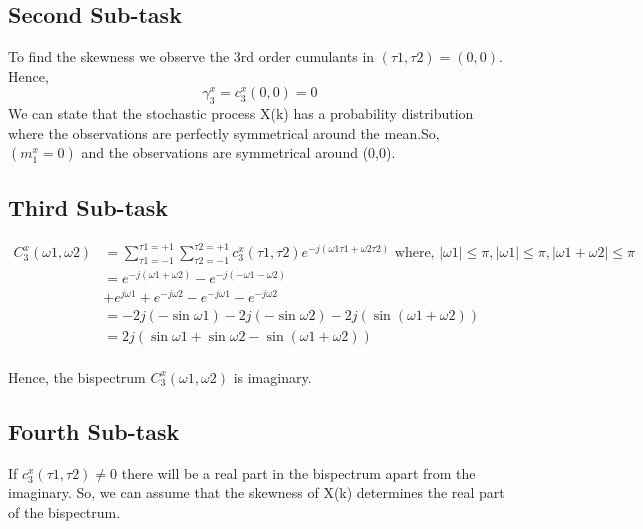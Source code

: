 \documentclass[a4paper]{article}
\begin{document}
\subsection{Second Sub-task}
To find the skewness we observe the 3rd order cumulants in \((\tau1,\tau2)=(0,0)\).\\Hence,
\[\gamma_3^x=c_3^x(0,0)=0\]
We can state that the stochastic process X(k) has a probability distribution where the observations are perfectly symmetrical around the mean.So, \((m_1^x=0)\) and the observations are symmetrical around (0,0).

\subsection{Third Sub-task}
\begin{equation*}
\begin{aligned}
C_3^x(\omega1,\omega2) &= \sum_{\tau1=-1}^{\tau1=+1}\sum_{\tau2=-1}^{\tau2=+1}c_3^x(\tau1,\tau2)
e^{-j(\omega1\tau1+\omega2\tau2)} \text{ where, } |\omega1|\leq\pi, |\omega1|\leq\pi,
|\omega1+\omega2|\leq\pi \\
&= e^{-j(\omega1+\omega2)}-e^{-j(-\omega1-\omega2)}\\
&+ e^{j\omega1} + e^{-j\omega2} - e^{-j\omega1} - e^{-j\omega2}\\
&= -2j(-\sin{\omega1}) - 2j(-\sin{\omega2}) - 2j(\sin{(\omega1+\omega2)})\\
&= 2j(\sin{\omega1}+\sin{\omega2}-\sin{(\omega1+\omega2)})
\end{aligned}
\end{equation*} \\
Hence, the bispectrum \(C_3^x(\omega1,\omega2)\) is imaginary.

\subsection{Fourth Sub-task}
If \(c_3^x(\tau1,\tau2)\neq0\) there will be a real part in the bispectrum apart from the imaginary.
So, we can assume that the skewness of X(k) determines the real part of the bispectrum.
\end{document}

